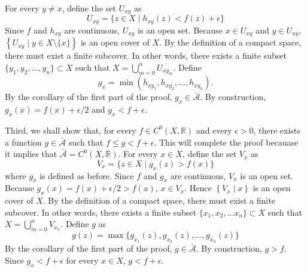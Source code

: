 \documentclass[12pt]{article}
\begin{document}
For every $y \ne x$, define the set $U_{xy}$ as
 $$U_{xy} = \{ z \in X \mid h_{xy} (z) < f(z) + \epsilon \}$$
Since $f$ and $h_{xy}$ are continuous, $U_{xy}$ is an open set.  Because $x \in U_{xy}$ and $y \in U_{xy}$, $\left\{ U_{xy} \mid y \in X \setminus \{x\} \right\}$ is an open cover of $X$.  By the definition of a compact space, there must exist a finite subcover.  In other words, there exists a finite subset $\{y_1, y_2, \ldots, y_n \} \subset X$ such that $X = \bigcup_{m=0}^n U_{xy_m}$.  Define $$g_x = \min (h_{xy_1}, h_{xy_2}, \ldots, h_{xy_n}).$$  By the corollary of the first part of the proof, $g_x \in \bar{\mathcal{A}}$.  By construction, $g_x(x) = f(x) + \epsilon / 2$ and $g_x < f + \epsilon$.

Third, we shall show that, for every $f \in C^0 (X, \mathbb{R})$ and every $\epsilon > 0$, there exists a function $g \in \bar{\mathcal{A}}$ such that $f \le g < f + \epsilon$.  This will complete the proof becauase it implies that $\bar{\mathcal{A}} = C^0 (X, \mathbb{R})$.  For every $x \in X$, define the set $V_x$ as
 $$V_x = \{ z \in X \mid g_{x} (z) > f(x) \}$$
where $g_x$ is defined as before.  Since $f$ and $g_x$ are continuous, $V_x$ is an open set.  Because $g_x(x)=f(x)+ \epsilon /2 > f(x)$, $x \in V_x$.  Hence $\left\{ V_x \mid x \right\}$ is an open cover of $X$.  By the definition of a compact space, there must exist a finite subcover.  In other words, there exists a finite subset $\{x_1, x_2, \ldots x_n \} \subset X$ such that $X = \bigcup_{m=0}^n V_{x_n}$.  Define $g$ as
 $$g (z) = \max \{ g_{x_1} (z), g_{x_2} (z), \ldots, g_{x_n} (z) \}$$
By the corollary of the first part of the proof, $g \in \bar{\mathcal{A}}$.  By construction, $g > f$.  Since $g_x < f + \epsilon$ for every $x \in X$, $g < f + \epsilon$.
\end{document}
